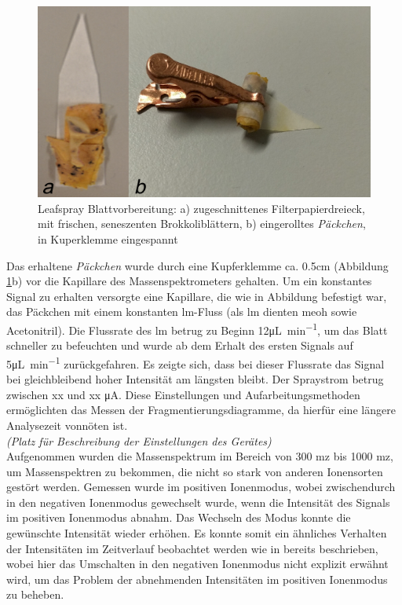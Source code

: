\begin{figure}[hbtp]
  \centering
  \includegraphics[scale=0.5]{figures/Kapitel4/VWA_MSLeafspray_Blattvobereitung_zwei.png}
  \caption[Leafspray Blattvorbereitung, Quelle: Author]{Leafspray Blattvorbereitung: a) zugeschnittenes Filterpapierdreieck, mit frischen, seneszenten Brokkoliblättern, b) eingerolltes \textit{Päckchen}, in Kuperklemme eingespannt}
  \label{fig:LeafsprayVorbereitung}
\end{figure}

Das erhaltene \textit{Päckchen} wurde durch eine Kupferklemme ca. 0.5cm (Abbildung \ref{fig:LeafsprayVorbereitung}b) vor die Kapillare des Massenspektrometers gehalten. Um ein konstantes Signal zu erhalten versorgte eine Kapillare, die wie in Abbildung befestigt war, das Päckchen mit einem konstanten \gls{lm}-Fluss (als \gls{lm} dienten \gls{meoh} sowie Acetonitril). Die Flussrate des \gls{lm} betrug zu Beginn 12\si{\uL\per\minute}, um das Blatt schneller zu befeuchten und wurde ab dem Erhalt des ersten Signals auf 5\si{\uL\per\minute} zurückgefahren. Es zeigte sich, dass bei dieser Flussrate das Signal bei gleichbleibend hoher Intensität am längsten bleibt. Der Spraystrom betrug zwischen xx und xx \si{\micro\ampere}. Diese Einstellungen und Aufarbeitungsmethoden ermöglichten das Messen der Fragmentierungsdiagramme, da hierfür eine längere Analysezeit vonnöten ist.\\

\textit{(Platz für Beschreibung der Einstellungen des Gerätes)}\\

Aufgenommen wurden die Massenspektrum im Bereich von 300 \gls{mz} bis 1000 \gls{mz}, um  Massenspektren zu bekommen, die nicht so stark von anderen Ionensorten gestört werden. Gemessen wurde im positiven Ionenmodus, wobei zwischendurch in den negativen Ionenmodus gewechselt wurde, wenn die Intensität des Signals im positiven Ionenmodus abnahm. Das Wechseln des Modus konnte die gewünschte Intensität wieder erhöhen. Es konnte somit ein ähnliches Verhalten der Intensitäten im Zeitverlauf beobachtet werden wie in \cite{RapidScreeningLeafSpray} bereits beschrieben, wobei hier das Umschalten in den negativen Ionenmodus nicht explizit erwähnt wird, um das Problem der abnehmenden Intensitäten im positiven Ionenmodus zu beheben.


